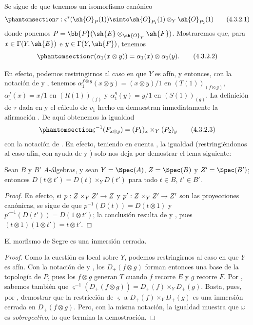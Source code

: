 \documentclass[oneside,10pt]{amsart}
\makeatletter
\newcommand{\ega@arrow}[2]{\mathchoice{#1}{#2}{#2}{#2}}
\renewcommand{\to}{\ega@arrow{\longrightarrow}{\rightarrow}}
\let\EGAOriginalLabel\label
\renewcommand{\label}[1]{\phantomsection\EGAOriginalLabel{#1}}
\makeatother
\begin{document}
\begin{env}[4.3.2]
\label{II.4.3.2}
Se sigue de  que tenemos un isomorfismo canónico
\[
\label{II.4.3.2.1}
  \tau:\varsigma^*(\sh{O}_P(1))\simto\sh{O}_{P_1}(1)\otimes_Y\sh{O}_{P_2}(1)
  \tag{4.3.2.1}
\]
donde ponemos $P=\bb{P}(\sh{E}\otimes_{\sh{O}_Y}\sh{F})$.
Mostraremos que, para $x\in\Gamma(Y,\sh{E})$ e $y\in\Gamma(Y,\sh{F})$, tenemos
\[
\label{II.4.3.2.2}
  \tau(\alpha_1(x\otimes y))=\alpha_1(x)\otimes\alpha_1(y).
  \tag{4.3.2.2}
\]

En efecto, podemos restringirnos al caso en que $Y$ es afín, y entonces, con la notación de  y , tenemos $\alpha_1^{f\otimes g}(x\otimes y)=(x\otimes y)/1$ en $(T(1))_{(f\otimes g)}$, $\alpha_1^f(x)=x/1$ en $(R(1))_{(f)}$ y $\alpha_1^g(y)=y/1$ en $(S(1))_{(g)}$.
La definición de $\tau$ dada en  y el cálculo de $v_1$ hecho en  demuestran inmediatamente la afirmación .
De aquí obtenemos la igualdad
\[
\label{II.4.3.2.3}
  \varsigma^{-1}(P_{x\otimes y})=(P_1)_x\times_Y(P_2)_y
  \tag{4.3.2.3}
\]
con la notación de .
En efecto, teniendo en cuenta , la igualdad  (restringiéndonos al caso afín, con ayuda de  y ) solo nos deja por demostrar el lema siguiente:

\begin{lemma}[4.3.2.4]
\label{II.4.3.2.4}
Sean $B$ y $B'$ $A$-álgebras, y sean $Y=\Spec(A)$, $Z=\Spec(B)$ y $Z'=\Spec(B')$;
entonces $D(t\otimes t')=D(t)\times_YD(t')$ para todo $t\in B$, $t'\in B'$.
\end{lemma}

\begin{proof}
En efecto, si $p:Z\times_YZ'\to Z$ y $p':Z\times_YZ'\to Z'$ son las proyecciones canónicas, se sigue de  que $p^{-1}(D(t))=D(t\otimes1)$ y ${p'}^{-1}(D(t'))=D(1\otimes t')$;
la conclusión resulta de  y , pues $(t\otimes1)(1\otimes t')=t\otimes t'$.
\end{proof}
\end{env}

\begin{proposition}[4.3.3]
\label{II.4.3.3}
El morfismo de Segre es una inmersión cerrada.
\end{proposition}

\begin{proof}
Como la cuestión es local sobre $Y$, podemos restringirnos al caso en que $Y$ es afín.
Con la notación de  y , los $D_+(f\otimes g)$ forman entonces una base de la topología de $P$, pues los $f\otimes g$ generan $T$ cuando $f$ recorre $E$ y $g$ recorre $F$.
Por , sabemos también que $\varsigma^{-1}(D_+(f\otimes g))=D_+(f)\times_YD_+(g)$.
Basta, pues, por , demostrar que la restricción de $\varsigma$ a $D_+(f)\times_YD_+(g)$ es una inmersión cerrada en $D_+(f\otimes g)$.
Pero, con la misma notación, la igualdad  muestra que $\omega$ es \emph{sobreyectivo}, lo que termina la demostración.
\end{proof}
\end{document}
